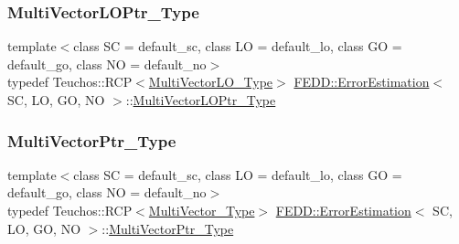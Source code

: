 \subsubsection{\texorpdfstring{Multi\+Vector\+L\+O\+Ptr\+\_\+\+Type}{MultiVectorLOPtr\_Type}}
{\footnotesize\ttfamily template$<$class SC  = default\+\_\+sc, class LO  = default\+\_\+lo, class GO  = default\+\_\+go, class NO  = default\+\_\+no$>$ \\
typedef Teuchos\+::\+R\+CP$<$\hyperlink{classFEDD_1_1ErrorEstimation_aabbb5539b0703f8c6c04fb6595397631}{Multi\+Vector\+L\+O\+\_\+\+Type}$>$ \hyperlink{classFEDD_1_1ErrorEstimation}{F\+E\+D\+D\+::\+Error\+Estimation}$<$ SC, LO, GO, NO $>$\+::\hyperlink{classFEDD_1_1ErrorEstimation_a00ba9c6b6b8c876b403e9c3a3c036151}{Multi\+Vector\+L\+O\+Ptr\+\_\+\+Type}}

\mbox{\label{classFEDD_1_1ErrorEstimation_a5882ff373bf8c409b407b4fd1f42bda0}} 
\subsubsection{\texorpdfstring{Multi\+Vector\+Ptr\+\_\+\+Type}{MultiVectorPtr\_Type}}
{\footnotesize\ttfamily template$<$class SC  = default\+\_\+sc, class LO  = default\+\_\+lo, class GO  = default\+\_\+go, class NO  = default\+\_\+no$>$ \\
typedef Teuchos\+::\+R\+CP$<$\hyperlink{classFEDD_1_1ErrorEstimation_a1c6fa9610a1e5e887e5a88ab33f1c792}{Multi\+Vector\+\_\+\+Type}$>$ \hyperlink{classFEDD_1_1ErrorEstimation}{F\+E\+D\+D\+::\+Error\+Estimation}$<$ SC, LO, GO, NO $>$\+::\hyperlink{classFEDD_1_1ErrorEstimation_a5882ff373bf8c409b407b4fd1f42bda0}{Multi\+Vector\+Ptr\+\_\+\+Type}}

\mbox{\label{classFEDD_1_1ErrorEstimation_af61aa23cb14996e497a1176d8fea650d}} 

